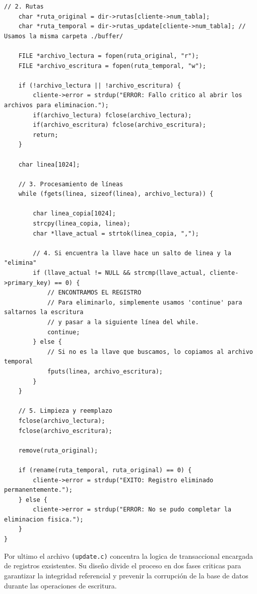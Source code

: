 \documentclass[12pt]{article}
\begin{document}
\begin{lstlisting}[style=estiloC ,title={Código 3. Servidor TCP (insercion.c)}]
    // 2. Rutas
    char *ruta_original = dir->rutas[cliente->num_tabla];
    char *ruta_temporal = dir->rutas_update[cliente->num_tabla]; // Usamos la misma carpeta ./buffer/

    FILE *archivo_lectura = fopen(ruta_original, "r");
    FILE *archivo_escritura = fopen(ruta_temporal, "w");

    if (!archivo_lectura || !archivo_escritura) {
        cliente->error = strdup("ERROR: Fallo critico al abrir los archivos para eliminacion.");
        if(archivo_lectura) fclose(archivo_lectura);
        if(archivo_escritura) fclose(archivo_escritura);
        return;
    }

    char linea[1024];

    // 3. Procesamiento de líneas
    while (fgets(linea, sizeof(linea), archivo_lectura)) {
        
        char linea_copia[1024];
        strcpy(linea_copia, linea);
        char *llave_actual = strtok(linea_copia, ",");

        // 4. Si encuentra la llave hace un salto de linea y la "elimina"
        if (llave_actual != NULL && strcmp(llave_actual, cliente->primary_key) == 0) {
            // ENCONTRAMOS EL REGISTRO
            // Para eliminarlo, simplemente usamos 'continue' para saltarnos la escritura
            // y pasar a la siguiente línea del while.
            continue; 
        } else {
            // Si no es la llave que buscamos, lo copiamos al archivo temporal
            fputs(linea, archivo_escritura);
        }
    }

    // 5. Limpieza y reemplazo
    fclose(archivo_lectura);
    fclose(archivo_escritura);

    remove(ruta_original);
    
    if (rename(ruta_temporal, ruta_original) == 0) {
        cliente->error = strdup("EXITO: Registro eliminado permanentemente.");
    } else {
        cliente->error = strdup("ERROR: No se pudo completar la eliminacion fisica.");
    }
}
\end{lstlisting}

Por ultimo el archivo \texttt{(update.c)} concentra la logica de transaccional encargada de registros exsistentes. Su diseño divide el proceso en dos fases criticas para garantizar la integridad referencial y prevenir la corrupción de la base de datos durante las operaciones de escritura.
\end{document}
